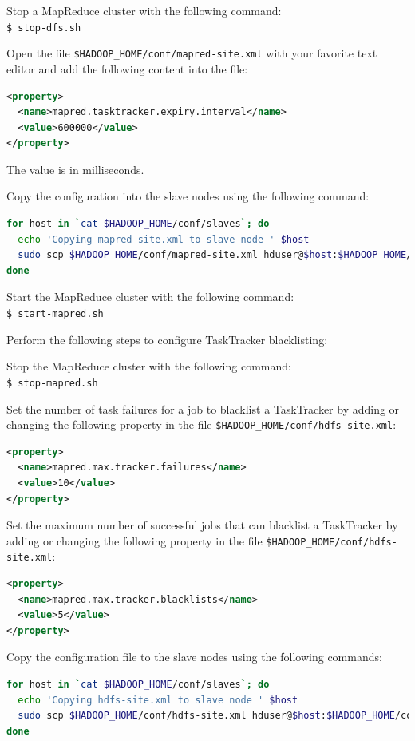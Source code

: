 Stop a MapReduce cluster with the following command:\\
\verb|$ stop-dfs.sh|

Open the file \verb|$HADOOP_HOME/conf/mapred-site.xml| with your favorite text editor and add the following content into the file:
\lstset{style=bashstyle}
\begin{lstlisting}[language=XML]
<property>
  <name>mapred.tasktracker.expiry.interval</name>
  <value>600000</value>
</property>
\end{lstlisting}

The value is in milliseconds.

Copy the configuration into the slave nodes using the following command:
\lstset{style=bashstyle}
\begin{lstlisting}[language=bash]
for host in `cat $HADOOP_HOME/conf/slaves`; do
  echo 'Copying mapred-site.xml to slave node ' $host
  sudo scp $HADOOP_HOME/conf/mapred-site.xml hduser@$host:$HADOOP_HOME/conf
done
\end{lstlisting}

Start the MapReduce cluster with the following command: \\
\verb|$ start-mapred.sh|

Perform the following steps to configure TaskTracker blacklisting:

Stop the MapReduce cluster with the following command: \\
\verb|$ stop-mapred.sh|

Set the number of task failures for a job to blacklist a TaskTracker by adding or changing the following property in the file \verb|$HADOOP_HOME/conf/hdfs-site.xml|:
\lstset{style=bashstyle}
\begin{lstlisting}[language=XML]
<property>
  <name>mapred.max.tracker.failures</name>
  <value>10</value>
</property>
\end{lstlisting}

Set the maximum number of successful jobs that can blacklist a TaskTracker by adding or changing the following property in the file \verb|$HADOOP_HOME/conf/hdfs-site.xml|:
\lstset{style=bashstyle}
\begin{lstlisting}[language=XML]
<property>
  <name>mapred.max.tracker.blacklists</name>
  <value>5</value>
</property>
\end{lstlisting}

Copy the configuration file to the slave nodes using the following commands:
\lstset{style=bashstyle}
\begin{lstlisting}[language=bash]
for host in `cat $HADOOP_HOME/conf/slaves`; do
  echo 'Copying hdfs-site.xml to slave node ' $host
  sudo scp $HADOOP_HOME/conf/hdfs-site.xml hduser@$host:$HADOOP_HOME/conf
done
\end{lstlisting}

